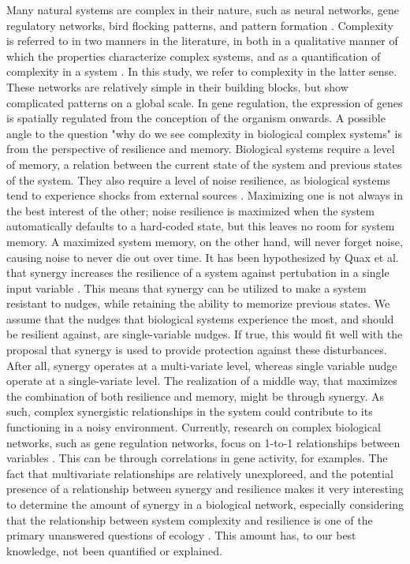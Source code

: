 \documentclass[../main.tex]{subfiles}
\begin{document}
Many natural systems are complex in their nature, such as neural networks, gene regulatory networks, bird flocking patterns, and pattern formation \cite{choi2001supply, gat1999synergy, kondo2010reaction, liang2008gene}.
Complexity is referred to in two manners in the literature, in both in a qualitative manner of which the properties characterize complex systems, and as a quantification of complexity in a system \cite{bar2004multiscale}.
In this study, we refer to complexity in the latter sense.
These networks are relatively simple in their building blocks, but show complicated patterns on a global scale.
In gene regulation, the expression of genes is spatially regulated from the conception of the organism onwards.
A possible angle to the question "why do we see  complexity in biological complex systems" is from the perspective of resilience and memory.
Biological systems require a level of memory, a relation between the current state of the system and previous states of the system. 
They also require a level of noise resilience, as biological systems tend to experience shocks from external sources \cite{peixoto2012emergence}. %
Maximizing one is not always in the best interest of the other; noise resilience is maximized when the system automatically defaults to a hard-coded state, but this leaves no room for system memory.
A maximized system memory, on the other hand, will never forget noise, causing noise to never die out over time.
It has been hypothesized by Quax et al. that synergy increases the resilience of a system against pertubation in a single input variable \cite{quax2017quantifying}.
This means that synergy can be utilized to make a system resistant to nudges, while retaining the ability to memorize previous states.
We assume that the nudges that biological systems experience the most, and should be resilient against, are single-variable nudges.
If true, this would fit well with the proposal that synergy is used to provide protection against these disturbances.
After all, synergy operates at a multi-variate level, whereas single variable nudge operate at a single-variate level.
The realization of a middle way, that maximizes the combination of both resilience and memory, might be through synergy.
As such, complex synergistic relationships in the system could contribute to its functioning in a noisy environment.
Currently, research on complex biological networks, such as gene regulation networks, focus on 1-to-1 relationships between variables \cite{}. %
This can be through correlations in gene activity, for examples.
The fact that multivariate relationships are relatively unexploreed, and the potential presence of a relationship between synergy and resilience makes it very interesting to determine the amount of synergy in a biological network, especially considering that the relationship between system complexity and resilience is one of the primary unanswered questions of ecology \cite{}.
This amount has, to our best knowledge, not been quantified or explained.
\end{document}
